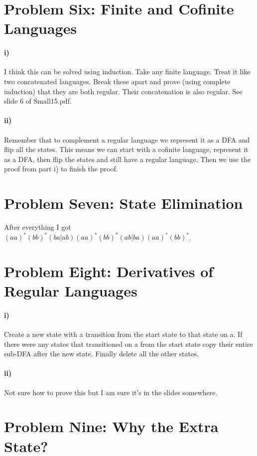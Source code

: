 \documentclass[10pt,letter]{article}
\begin{document}
\section*{Problem Six: Finite and Cofinite Languages}

\paragraph{i)} I think this can be solved using induction. Take any finite language. Treat it like two concatenated languages. Break these apart and prove (using complete induction) that they are both regular. Their concatenation is also regular. See slide 6 of Small15.pdf.

\paragraph{ii)} Remember that to complement a regular language we represent it as a DFA and flip all the states. This means we can start with a cofinite language, represent it as a DFA, then flip the states and still have a regular language. Then we use the proof from part i) to finish the proof.

\section*{Problem Seven: State Elimination}
After everything I got $(aa)^*(bb)^*(ba|ab)(aa)^*(bb)^*(ab|ba)(aa)^*(bb)^*$.

\section*{Problem Eight: Derivatives of Regular Languages}

\paragraph{i)} Create a new state with a transition from the start state to that state on a. If there were any states that transitioned on a from the start state copy their entire sub-DFA after the new state. Finally delete all the other states.

\paragraph{ii)} Not sure how to prove this but I am sure it's in the slides somewhere.

\section*{Problem Nine: Why the Extra State?} 
\end{document}
